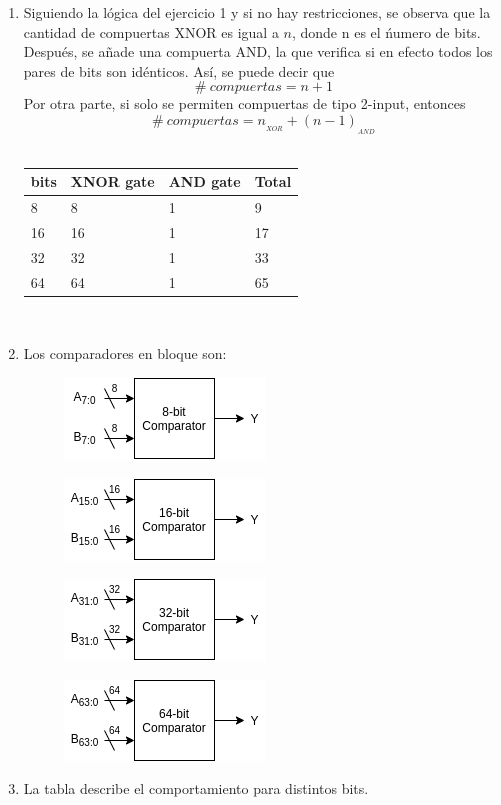 \documentclass[11pt,a4paper]{article}
\begin{document}
\begin{enumerate}
\begin{enumerate}[label=(\alph*)]
\item Siguiendo la lógica del ejercicio 1 y si no hay restricciones, se observa que la cantidad de compuertas XNOR es igual a $n$, donde n es el ńumero de bits. Después, se añade una compuerta AND, la que verifica si en efecto  todos los pares de bits son idénticos. Así, se puede decir que
$$\# \ compuertas = n + 1$$
Por otra parte, si solo se permiten compuertas de tipo 2-input, entonces
$$\# \ compuertas = n_{_{XOR}} + (n - 1)_{_{AND}}$$
\\
\begin{table}[h]
\centering
\begin{tabular}{|l|l|l|l|}
\hline
bits & XNOR gate & AND gate&Total\\
\hline
8&8&1&9\\
\hline
16&16&1&17\\
\hline
32&32&1&33\\
\hline
64&64&1&65\\
\hline
\end{tabular}
\end{table}
\\
\item Los comparadores en bloque son:
\begin{figure}[h]
\centering
\includegraphics[scale=1]{8bit.png} 
\end{figure}
\begin{figure}[h]
\centering
\includegraphics[scale=1]{16bit.png} 
\end{figure}
\begin{figure}[h!]
\centering
\includegraphics[scale=1]{32bit.png} 
\end{figure}
\begin{figure}[h!]
\centering
\includegraphics[scale=1]{64bit.png} 
\end{figure}
\pagebreak
\item La tabla describe el comportamiento para distintos bits.


\end{enumerate}
\end{enumerate}
\end{document}
